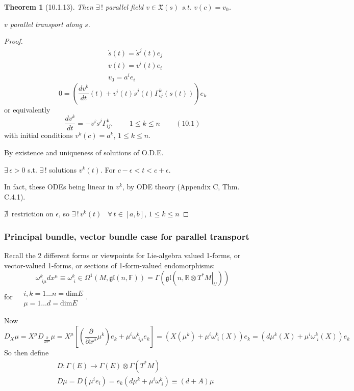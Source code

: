 \documentclass[10pt]{amsart}
\newtheorem{theorem}{Theorem}
\begin{document}
\begin{multicols*}{2}
\begin{theorem}[10.1.13]
Then $\exists \, !$ parallel field $v\in \mathfrak{X}(s)$ s.t. $v(c) = v_0$.  

$v$ parallel transport along $s$.  
\end{theorem}
\begin{proof}
	\[
\begin{aligned}
	& \dot{s}(t) = \dot{s}^j(t) e_j \\ 
	&  v(t) = v^i(t) e_i  \\
& v_0 = a^i e_i
\end{aligned}
\]
\[
0 = \left( \frac{dv^k}{dt}(t) + v^i(t) \dot{s}^j(t) \Gamma^k_{ij}(s(t)) \right) e_k
\]
or equivalently
\begin{equation}
	\frac{dv^k}{dt} = - v^i \dot{s}^j \Gamma^k_{ij} , \qquad \, 1\leq k \leq n \qquad \, (10.1)
\end{equation}
with initial conditions $v^k(c) = a^k$, $1\leq k \leq n$.  

By existence and uniqueness of solutions of O.D.E.  

$\exists \, \epsilon > 0$ s.t. $\exists \, !$ solutions $v^k(t)$.  For $c-\epsilon < t < c+\epsilon$.  

In fact, these ODEs being linear in $v^k$,  by ODE theory (Appendix C, Thm. C.4.1).  

$\nexists \, $ restriction on $\epsilon$, so $\exists \, ! \, v^k(t)$ \, $\forall \, t \in [a,b]$, $1\leq k \leq n$  

\end{proof}




\subsubsection{Principal bundle, vector bundle case for parallel transport}  

Recall the 2 different forms or viewpoints for Lie-algebra valued 1-forms, or vector-valued 1-forms, or sections of 1-form-valued endomorphisms:
\[
\omega^k_{ \,\, i\mu} dx^{\mu} \equiv \omega^k_{\,\,i} \in \Omega^1(M,\mathfrak{gl}(n,\mathbb{F})) = \Gamma(\mathfrak{gl}(n,\mathbb{R} \otimes \left. T^* M \right|_U ) )
\] 
for $\begin{aligned} & \quad \\
	& i,k = 1\dots n =\text{dim}E \\ 
	& \mu = 1\dots d =\text{dim}E \end{aligned}$.  

Now
\[
D_X\mu = X^{\mu} D_{\frac{\partial }{ \partial x^{\mu}}}\mu = X^{\mu} \left[ \left( \frac{ \partial }{ \partial x^{\mu}} \mu^k \right) e_k + \mu^i \omega^k_{ \,\, i\mu} e_k \right] = \left( X(\mu^k) + \mu^i \omega^k_{ \,\, i}(X) \right) e_k = \left( d\mu^k(X) + \mu^i \omega^k_{ \,\, i}(X) \right) e_k
\]
So then define 
\begin{equation}
	\begin{aligned}
		& D: \Gamma(E) \to \Gamma(E) \otimes \Gamma(T^*M) \\
	& D\mu  = D(\mu^i e_i) = e_k ( d\mu^k +\mu^i \omega^k_{ \,\, i}) \equiv (d+A)\mu
	\end{aligned}
\end{equation}


\end{multicols*}
\end{document}
